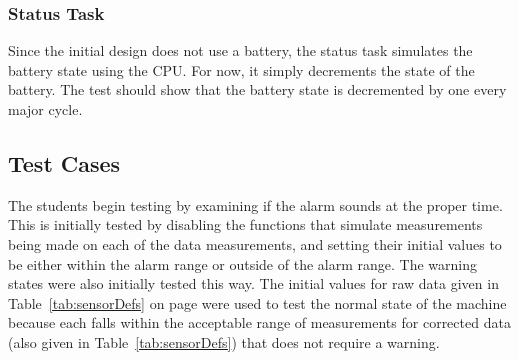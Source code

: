 \documentclass[12pt]{article} %
\begin{document}
\subsubsection{Status Task}
Since the initial design does not use a battery, the status task simulates the
battery state using the CPU.  For now, it simply decrements the state of the
battery.  The test should show that the battery state is decremented by one
every major cycle.

\subsection{Test Cases}

The students begin testing by examining if the alarm sounds at the proper time.
This is initially tested by disabling the functions that simulate measurements
being made on each of the data measurements, and setting their initial values
to be either within the alarm range or outside of the alarm range. The warning
states were also initially tested this way. The initial values for raw data
given in Table~\ref{tab:sensorDefs} on page \pageref{tab:sensorDefs} were used
to test the normal state of the machine because each falls within the
acceptable range of measurements for corrected data (also given in
Table~\ref{tab:sensorDefs}) that does not require a warning.
	
\end{document}
